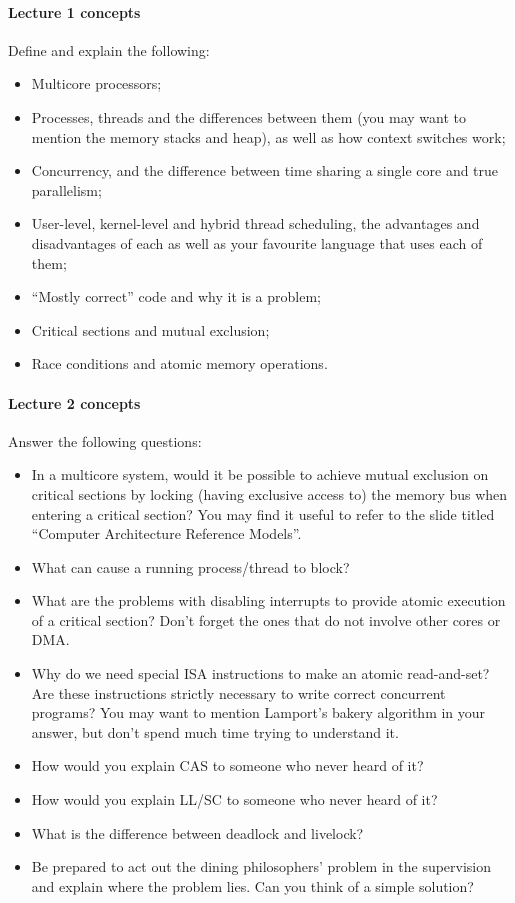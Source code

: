 \documentclass[12pt,a4paper,oneside,openright]{report}
\newcommand{\question}[2]{\paragraph{#1} #2}
\begin{document}
\question{Lecture 1 concepts}{Define and explain the following:
  \begin{itemize}
  \item Multicore processors;
  \item Processes, threads and the differences between them (you may
    want to mention the memory stacks and heap), as well as how
    context switches work;
  \item Concurrency, and the difference between time sharing a single
    core and true parallelism;
  \item User-level, kernel-level and hybrid thread scheduling, the
    advantages and disadvantages of each as well as your favourite
    language that uses each of them;
  \item ``Mostly correct'' code and why it is a problem;
  \item Critical sections and mutual exclusion;
  \item Race conditions and atomic memory operations.
  \end{itemize}
}

\question{Lecture 2 concepts}{Answer the following questions:
  \begin{itemize}
  \item In a multicore system, would it be possible to achieve mutual
    exclusion on critical sections by locking (having exclusive access
    to) the memory bus when entering a critical section? You may find
    it useful to refer to the slide titled ``Computer Architecture
    Reference Models''.
  \item What can cause a running process/thread to block?
  \item What are the problems with disabling interrupts to provide
    atomic execution of a critical section? Don't forget the ones that
    do not involve other cores or DMA.
  \item Why do we need special ISA instructions to make an atomic
    read-and-set? Are these instructions strictly necessary to write
    correct concurrent programs? You may want to mention Lamport's
    bakery algorithm in your answer, but don't spend much time trying
    to understand it.
  \item How would you explain CAS to someone who never heard of it?
  \item How would you explain LL/SC to someone who never heard of it?
  \item What is the difference between deadlock and livelock?
  \item Be prepared to act out the dining philosophers' problem in the
    supervision and explain where the problem lies. Can you think of a
    simple solution?
  \end{itemize}
}
\end{document}
